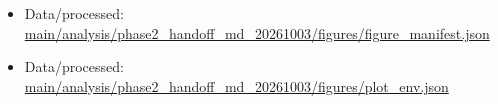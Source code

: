 \begin{itemize}[leftmargin=1.4em,noitemsep]
\item Data/processed: \begingroup\scriptsize\url{main/analysis/phase2_handoff_md_20261003/figures/figure_manifest.json}\endgroup
\item Data/processed: \begingroup\scriptsize\url{main/analysis/phase2_handoff_md_20261003/figures/plot_env.json}\endgroup
\end{itemize}
